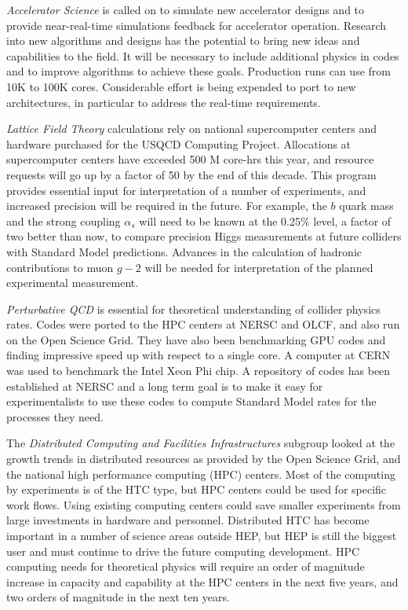 {\it Accelerator Science} is called on to simulate new accelerator designs
and to provide near-real-time simulations feedback for accelerator
operation. 
Research into new algorithms and designs has the potential to bring new ideas and
capabilities to the field.
It will be necessary to include additional physics in codes and
to improve algorithms to achieve these goals. Production runs can use from
10K to 100K cores. Considerable effort is being expended to port to new
architectures, in particular to address the real-time requirements.

{\it Lattice Field Theory} calculations rely on national supercomputer
centers and hardware purchased for the USQCD Computing Project. Allocations
at supercomputer centers have exceeded 500 M core-hrs this year, and
resource requests will go up by a factor of 50 by the end of this decade.
This program provides essential input for interpretation of a number of
experiments, and increased precision will be required in the future. For
example, the $b$ quark mass and the strong coupling $\alpha_s$ will need to
be known at the 0.25\% level, a factor of two better than now, to compare
precision Higgs measurements at future colliders with 
Standard Model predictions.  Advances
in the calculation of hadronic contributions to muon $g-2$ will be needed
for interpretation of the planned experimental measurement.

{\it Perturbative QCD} is essential for theoretical understanding of
collider physics rates. Codes were ported to the HPC centers at NERSC and
OLCF, and also run on the Open Science Grid. They have also been
benchmarking GPU codes and finding impressive speed up with respect to
 a single core.
A computer at CERN was used to benchmark the Intel Xeon Phi chip.
A repository of codes has been established at NERSC and a long term goal is
to make it easy for experimentalists to use these codes to compute Standard
Model rates for the processes they need.

The {\it Distributed Computing and Facilities Infrastructures} subgroup
looked at the growth trends in distributed resources as provided by the
Open Science Grid, and the national high performance computing (HPC)
centers. Most of the computing by experiments is of the HTC type, but HPC
centers could be used for specific work flows. Using existing computing
centers could save smaller experiments from large investments in hardware
and personnel. Distributed HTC has become important in a number of science
areas outside HEP, but HEP is still the biggest user and must continue to
drive the future computing development. HPC computing needs for theoretical
physics will require an order of magnitude increase in capacity and
capability at the HPC centers in the next five years, and two orders of
magnitude in the next ten years.

